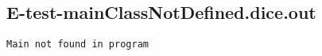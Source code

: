 \subsection{E-test-mainClassNotDefined.dice.out}
\begin{verbatim}
Main not found in program

\end{verbatim}